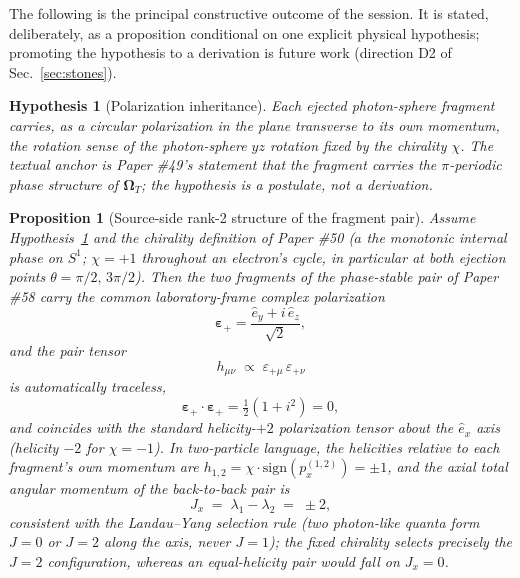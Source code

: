 \documentclass[%
 reprint, amsmath,amssymb, aps, prb, ]{revtex4-2}
\numberwithin{equation}{section}
\newtheorem{hypothesis}{Hypothesis}[section]
\newtheorem{proposition}{Proposition}[section]
\newcommand{\iphase}{\theta}  %
\begin{document}
The following is the principal constructive outcome of the session. It is stated, deliberately, as a proposition conditional on one explicit physical hypothesis; promoting the hypothesis to a derivation is future work (direction D2 of Sec.~\ref{sec:stones}).

\begin{hypothesis}[Polarization inheritance]
\label{hyp:H}
Each ejected photon-sphere fragment carries, as a circular polarization in the plane transverse to its own momentum, the rotation sense of the photon-sphere $yz$ rotation fixed by the chirality $\chi$. The textual anchor is Paper \#49's statement that the fragment carries the $\pi$-periodic phase structure of $\boldsymbol{\Omega}_T$; the hypothesis is a postulate, not a derivation.
\end{hypothesis}

\begin{proposition}[Source-side rank-2 structure of the fragment pair]
\label{prop:rank2}
Assume Hypothesis~\ref{hyp:H} and the chirality definition of Paper \#50 ($a$ the monotonic internal phase on $S^1$; $\chi=+1$ throughout an electron's cycle, in particular at both ejection points $\iphase=\pi/2,\,3\pi/2$). Then the two fragments of the phase-stable pair of Paper \#58 carry the common laboratory-frame complex polarization
\begin{equation}
\bm{\varepsilon}_+ = \frac{\hat e_y + i\,\hat e_z}{\sqrt{2}},
\label{eq:epsplus}
\end{equation}
and the pair tensor
\begin{equation}
h_{\mu\nu} \;\propto\; \varepsilon_{+\mu}\,\varepsilon_{+\nu}
\label{eq:pairtensor}
\end{equation}
is automatically traceless,
\begin{equation}
\bm{\varepsilon}_+\!\cdot\bm{\varepsilon}_+ = \tfrac{1}{2}\left(1 + i^2\right) = 0,
\label{eq:traceless}
\end{equation}
and coincides with the standard helicity-$+2$ polarization tensor about the $\hat e_x$ axis (helicity $-2$ for $\chi=-1$). In two-particle language, the helicities relative to each fragment's own momentum are $h_{1,2}=\chi\cdot\mathrm{sign}(p_x^{(1,2)})=\pm1$, and the axial total angular momentum of the back-to-back pair is
\begin{equation}
J_x \;=\; \lambda_1 - \lambda_2 \;=\; \pm 2,
\label{eq:Jx}
\end{equation}
consistent with the Landau--Yang selection rule (two photon-like quanta form $J=0$ or $J=2$ along the axis, never $J=1$); the fixed chirality selects precisely the $J=2$ configuration, whereas an equal-helicity pair would fall on $J_x=0$.
\end{proposition}
\end{document}
